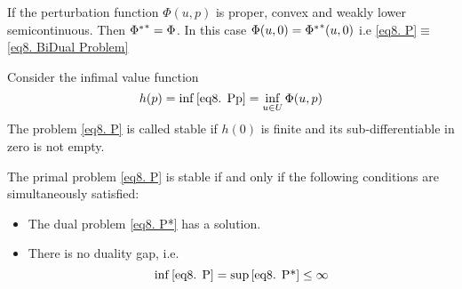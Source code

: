  	If the perturbation function $\Phi(u,p)$ is proper, convex and weakly lower semicontinuous. Then ${{\Phi}^{\ast}}^{\ast}=\Phi$. In this case $\Phi (u, 0) ={{\Phi}^{\ast}}^{\ast}(u, 0)$ i.e \eqref{eq8. P}$\equiv$ \eqref{eq8. BiDual Problem}

  \begin{definition}
  		Consider the infimal value function
  		\[
  		h(p)=\inf \eqref{eq8. Pp} = \inf_{u \in U} \Phi(u,p)
  		\]
  	The problem \eqref{eq8. P} is called stable if $h(0)$ is finite and its sub-differentiable in zero is not empty.
  	\end{definition}
  	
  \begin{theorem}
  	The primal problem \eqref{eq8. P} is stable 
  	if and only if the following conditions are simultaneously satisfied:
  	\begin{itemize}
  		\item The dual problem \eqref{eq8. P*} has a solution.
  		\item There is no duality gap, i.e.
  		\[ 
	  		\inf\eqref{eq8. P}= \sup\eqref{eq8. P*} \leq\infty
  		\]
  	\end{itemize}
 \end{theorem}	


